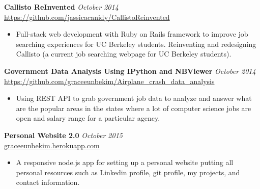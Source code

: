 \documentclass[9pt]{extarticle}
\begin{document}
\begin{body}

\textbf {Callisto ReInvented} 
\hfill 
\emph{October 2014}\\
\url{https://github.com/jassicacanidy/CallistoReinvented}
\vspace*{-4pt}
\begin{itemize}
	\item Full-stack web development with Ruby on Rails framework to improve job searching experiences for UC Berkeley students. Reinventing and redesigning Callisto (a current job searching webpage for UC Berkeley students).
\end{itemize}

\textbf {Government Data Analysis Using IPython and NBViewer} 
\hfill 
\emph{October 2014}\\
\url{https://github.com/graceeunbekim/Airplane_crash_data_analysis}
\vspace*{-4pt}
\begin{itemize}
    \item Using REST API to grab government job data to analyze and answer what are the popular areas in the states where a lot of computer science jobs are open and salary range for a particular agency.
\end{itemize}
\vspace*{-1pt}


\textbf {Personal Website 2.0} 
\hfill 
\emph{October 2015}\\
\url{graceeunbekim.herokuapp.com}
\vspace*{-3pt}
\begin{itemize}
	\item A responsive node.js app for setting up a personal website putting all personal resources such as Linkedin profile, git profile, my projects, and contact information.
\end{itemize}
\end{body}


\end{document}
